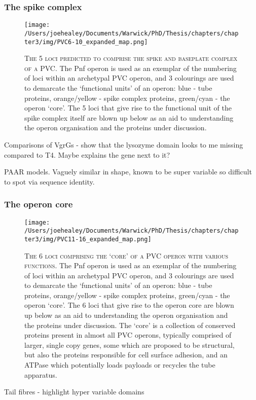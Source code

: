 \subsubsection{The spike complex}
\begin{figure}[h!]
\texttt{[image: /Users/joehealey/Documents/Warwick/PhD/Thesis/chapters/chapter3/img/PVC6-10\_expanded\_map.png]}
	\captionsetup{singlelinecheck=off, justification=justified, font=footnotesize, aboveskip=10pt}
	\caption[Spike complex protein region of a PVC operon]{\textsc{\normalsize The 5 loci predicted to comprise the spike and baseplate complex of a PVC.}\vspace{0.1cm} \newline The Pnf operon is used as an exemplar of the numbering of loci within an archetypal PVC operon, and 3 colourings are used to demarcate the `functional units' of an operon: blue - tube proteins, orange/yellow - spike complex proteins, green/cyan - the operon `core'. The 5 loci that give rise to the functional unit of the spike complex itself are blown up below as an aid to understanding the operon organisation and the proteins under discussion.}
	\label{PVC6-10map}
\end{figure}


Comparisons of VgrGs - show that the lysozyme domain looks to me missing compared to T4. Maybe explains the gene next to it?

PAAR models. Vaguely similar in shape, known to be super variable so difficult to spot via sequence identity.

\subsubsection{The operon core}
\begin{figure}[h!]
\texttt{[image: /Users/joehealey/Documents/Warwick/PhD/Thesis/chapters/chapter3/img/PVC11-16\_expanded\_map.png]}
	\captionsetup{singlelinecheck=off, justification=justified, font=footnotesize, aboveskip=10pt}
	\caption[`Core' protein region of a PVC operon]{\textsc{\normalsize The 6 loci comprising the `core' of a PVC operon with various functions.}\vspace{0.1cm} \newline The Pnf operon is used as an exemplar of the numbering of loci within an archetypal PVC operon, and 3 colourings are used to demarcate the `functional units' of an operon: blue - tube proteins, orange/yellow - spike complex proteins, green/cyan - the operon `core'. The 6 loci that give rise to the operon core are blown up below as an aid to understanding the operon organisation and the proteins under discussion. The `core' is a collection of conserved proteins present in almost all PVC operons, typically comprised of larger, single copy genes, some which are proposed to be structural, but also the proteins responsible for cell surface adhesion, and an ATPase which potentially loads payloads or recycles the tube apparatus.}
	\label{PVC11-16map}
\end{figure}
Tail fibres - highlight hyper variable domains

